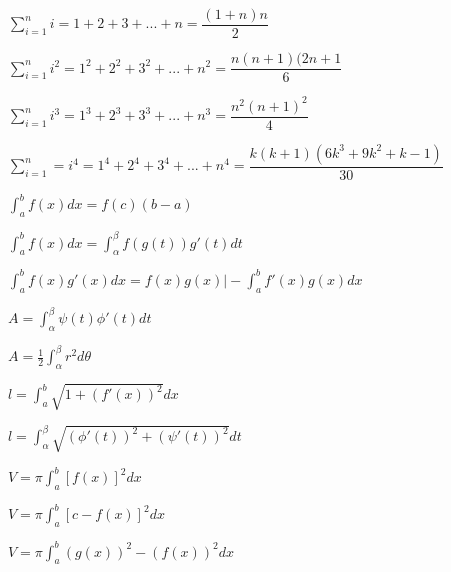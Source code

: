 \documentclass{article}
\begin{document}
\item $\sum_{i=1}^{n} i = 1+2+3+...+n = \dfrac{(1+n)n}{2}$
\item $\sum_{i=1}^{n} i^2 = 1^2 + 2^2 + 3^2+ ... + n^2 = \dfrac{n(n+1)(2n+1}{6}$
\item $\sum_{i=1}^{n} i^3 = 1^3 + 2^3 + 3^3+ ... + n^3 = \dfrac{n^2 ( n+1 ) ^2}{4}$
\item $\sum_{i=1}^{n} = i^4 = 1^4 + 2^4 + 3^4+ ... + n^4 = \dfrac{k(k+1)(6k^3+9k^2 + k-1)}{30}$
\item $\int_a^b f(x)dx = f(c)(b-a)$
\item $\int_a^b f(x)dx = \int_\alpha^\beta f(g(t))g'(t) dt$
\item $\int_a^b f(x)g'(x)dx = f(x)g(x)\rvert - \int_a^b f'(x)g(x)dx$
\item $A = \int_\alpha^\beta \psi(t)\phi'(t)dt$
\item $A = \frac{1}{2} \int_\alpha^\beta r^2 d\theta$
\item $l = \int_a^b \sqrt{1 + (f'(x))^2}dx$
\item $l = \int_\alpha^\beta \sqrt{(\phi'(t))^2 + (\psi'(t))^2}dt$
\item $V = \pi\int_a^b[f(x)]^2dx$
\item $V = \pi\int_a^b[c - f(x)]^2dx$
\item $V = \pi\int_a^b (g(x))^2 - (f(x))^2dx$
\end{document}
